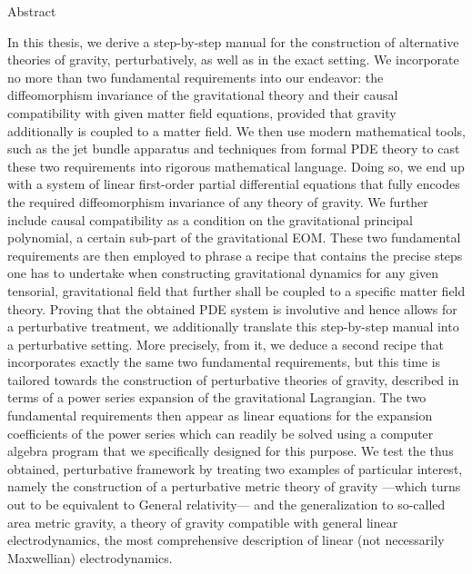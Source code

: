 \documentclass[a4paper,12pt, DIV=14, BCOR=5mm, twoside, headsepline, numbers=noenddot]{scrbook}
\newenvironment{abstract}{%
  \titlepage%
  \null\vfil%
  \begin{center}\normalfont\usekomafont{disposition}Abstract\end{center}%
}{%
  \par
  \vfil\null%
  \endtitlepage%
}
\begin{document}
\begin{abstract}
In this thesis, we derive a step-by-step manual for the construction of alternative theories of gravity, perturbatively, as well as in the exact setting. We
incorporate no more than two fundamental requirements into our endeavor: the diffeomorphism invariance of the gravitational theory and their causal compatibility with given matter field equations, provided that gravity additionally is coupled to a matter field. We then use modern mathematical tools, such as the jet bundle apparatus and techniques from formal PDE theory to cast these two requirements into rigorous mathematical language. Doing so, we end up with a system of linear first-order partial differential equations that fully encodes the required diffeomorphism invariance of any theory of gravity. We further include causal compatibility as a condition on the gravitational principal polynomial, a certain sub-part of the gravitational EOM. 
These two fundamental requirements are then employed to phrase a recipe that contains the precise steps one has to undertake when constructing gravitational dynamics for any given tensorial, gravitational field that further shall be coupled to a specific matter field theory.
Proving that the obtained PDE system is involutive and hence allows for a perturbative treatment, we additionally translate this step-by-step manual into a perturbative setting.
More precisely, from it, we deduce a second recipe that incorporates exactly the same two fundamental requirements, but this time is tailored towards the construction of perturbative theories of gravity, described in terms of a power series expansion of the gravitational Lagrangian. The two fundamental requirements then appear as linear equations for the expansion coefficients of the power series which can readily be solved using a computer algebra program that we specifically designed for this purpose. We test the thus obtained, perturbative framework by treating two examples of particular interest, namely the construction of a perturbative metric theory of gravity ---which turns out to be equivalent to General relativity--- and the generalization to so-called area metric gravity, a theory of gravity compatible with general linear electrodynamics, the most comprehensive description of linear (not necessarily Maxwellian) electrodynamics.
\end{abstract}
\end{document}
